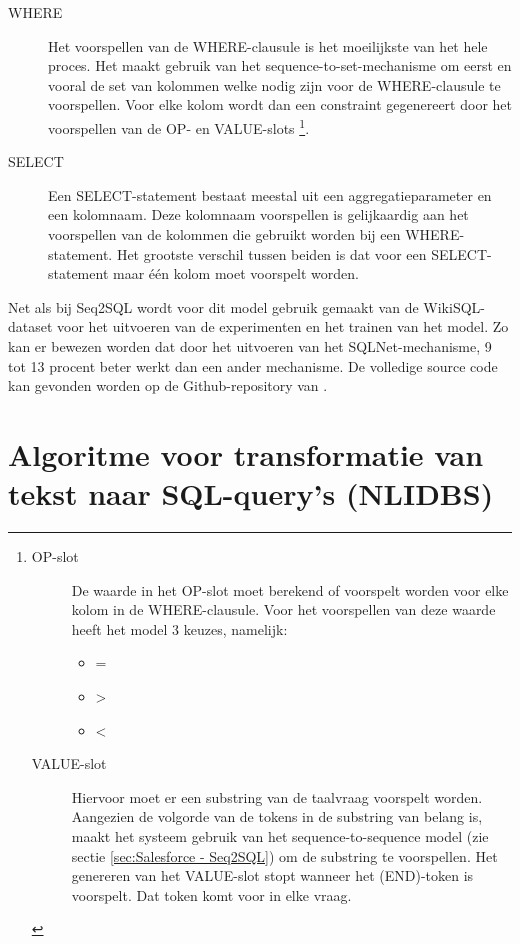 \begin{description}
	\item[WHERE] Het voorspellen van de WHERE-clausule is het moeilijkste van het hele proces. Het maakt gebruik van het sequence-to-set-mechanisme om eerst en vooral de set van kolommen welke nodig zijn voor de WHERE-clausule te voorspellen. Voor elke kolom wordt dan een constraint gegenereert door het voorspellen van de OP- en VALUE-slots 
	\footnote{
		\begin{description}
			\item[OP-slot] De waarde in het OP-slot moet berekend of voorspelt worden voor elke kolom in de WHERE-clausule. Voor het voorspellen van deze waarde heeft het model 3 keuzes, namelijk:
			\begin{itemize}
				\item =
				\item >
				\item <
			\end{itemize}
			\item[VALUE-slot] Hiervoor moet er een substring van de taalvraag voorspelt worden. Aangezien de volgorde van de tokens  in de substring van belang is, maakt het systeem gebruik van het sequence-to-sequence model (zie sectie \ref{sec:Salesforce - Seq2SQL}) om de substring te voorspellen. Het genereren van het VALUE-slot stopt wanneer het (END)-token is voorspelt. Dat token komt voor in elke vraag.
		\end{description}
	}.
	\item[SELECT] Een SELECT-statement bestaat meestal uit een aggregatieparameter en een kolomnaam. Deze kolomnaam voorspellen is gelijkaardig aan het voorspellen van de kolommen die gebruikt worden bij een WHERE-statement. Het grootste verschil tussen beiden is dat voor een SELECT-statement maar één kolom moet voorspelt worden.
\end{description}

Net als bij Seq2SQL wordt voor dit model gebruik gemaakt van de WikiSQL-dataset voor het uitvoeren van de experimenten en het trainen van het model. Zo kan er bewezen worden dat door het uitvoeren van het SQLNet-mechanisme, 9 tot 13 procent beter werkt dan een ander mechanisme. De volledige source code kan gevonden worden op de Github-repository van \textcite{sqlnet}.

\section{Algoritme voor transformatie van tekst naar SQL-query's (NLIDBS)}

